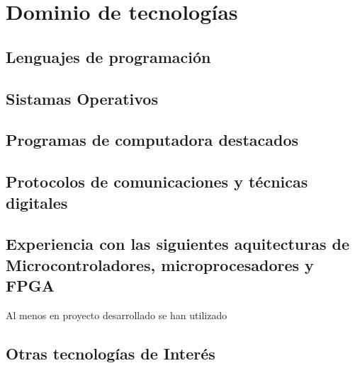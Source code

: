 
\section{Dominio de tecnologías}
   \subsection{Lenguajes de programación}
      \cvitem { \dicadvanced }{\proglangadvanced }
      \cvitem { \dicmedium   }{\proglangmedium   }
      \cvitem { \dicbasic    }{\proglangbasic    }

   \subsection{Sistamas Operativos}
      \cvitem { \dicadvanced } { \osadvanced }
      \cvitem { \dicmedium   } { \osmedium   }
      \cvitem { \dicbasic    } { \osbasic    }

   \subsection{Programas de computadora destacados}
      \cvitem { \dicadvanced } { \computerprogadvanced }
      \cvitem { \dicmedium   } { \computerprogmedium   }
      \cvitem { \dicbasic    } { \computerprogbasic    }

   \subsection{Protocolos de comunicaciones y técnicas digitales}
      \cvitem{\dicadvanced }{ \protocoladvanced }
      \cvitem{\dicmedium   }{ \protocolmedium   }
      \cvitem{\dicbasic    }{ \protocolbasic    }

   \subsection{Experiencia con las siguientes aquitecturas de Microcontroladores, microprocesadores y FPGA}
      \cvitem {} { Al menos en proyecto desarrollado se han utilizado}

   \subsection{Otras tecnologías de Interés}
      \cvitem{\dicadvanced} { \othertechadvanced }
      \cvitem{\dicmedium  } { \othertechmedium   }
      \cvitem{\dicbasic   } { \othertechbasic    }

